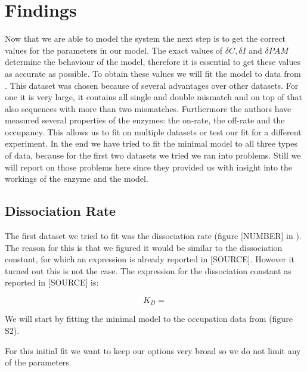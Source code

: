 \chapter{Findings}

Now that we are able to model the system the next step is to get the correct values for the parameters in our model. The exact values of $\delta C, \delta I$ and $\delta PAM$ determine the behaviour of the model, therefore it is essential to get these values as accurate as possible. To obtain these values we will fit the model to data from \cite{PNAS}. This dataset was chosen because of several advantages over other datasets. For one it is very large, it contains all single and double mismatch and on top of that also sequences with more than two mismatches. Furthermore the authors have measured several properties of the enzymes: the on-rate, the off-rate and the occupancy. This allows us to fit on multiple datasets or test our fit for a different experiment. In the end we have tried to fit the minimal model to all three types of data, because for the first two datasets we tried we ran into problems. Still we will report on those problems here since they provided us with insight into the workings of the enzyme and the model.

\section{Dissociation Rate}

The first dataset we tried to fit was the dissociation rate (figure [NUMBER] in \cite{PNAS}). %
The reason for this is that we figured it would be similar to the dissociation constant, for which an expression is already reported in [SOURCE]. %
However it turned out this is not the case. The expression for the dissociation constant as reported in [SOURCE] is: %

\begin{equation}
K_D = 
\end{equation}


We will start by fitting the minimal model to the occupation data from \cite{PNAS} (figure S2).

For this initial fit we want to keep our options very broad so we do not limit any of the parameters. 